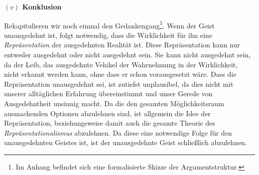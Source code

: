 \documentclass[a4paper, 12pt]{article}
\begin{document}
\begin{onehalfspace}
\vspace{5mm}
\noindent\textbf{$(v)$ Konklusion}

\noindent Rekapitulieren wir noch einmal den Gedankengang\footnote{Im Anhang befindet sich eine formalisierte Skizze der Argumentstruktur.}. Wenn der Geist unausgedehnt ist, folgt notwendig, dass die Wirklichkeit für ihn eine \emph{Repräsentation} der ausgedehnten Realität ist. Diese Repräsentation kann nur entweder ausgedehnt oder nicht ausgedehnt sein. Sie kann nicht ausgedehnt sein, da der Leib, das ausgedehnte Vehikel der Wahrnehmung in der Wirklichkeit, nicht erkannt werden kann, ohne dass er schon vorausgesetzt wäre. Dass die Repräsentation unausgedehnt sei, ist zutiefst unplausibel, da dies nicht mit unserer alltäglichen Erfahrung übereinstimmt und unser Gerede von Ausgedehntheit unsinnig macht. Da die den gesamten Möglichkeitsraum ausmachenden Optionen abzulehnen sind, ist allgemein die Idee der Repräsentation, beziehungsweise damit auch die gesamte Theorie des \emph{Repräsentationalismus} abzulehnen. Da diese eine notwendige Folge für den unausgedehnten Geistes ist, ist der unausgedehnte Geist schließlich abzulehnen.











\end{onehalfspace}
\end{document}
